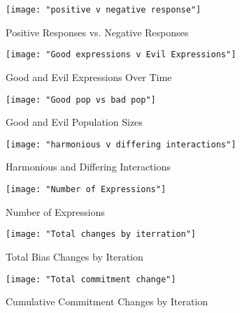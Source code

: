 \documentclass[]{article}
\begin{document}
\begin{figure}
	\centering
	\texttt{[image: "positive v negative response"]}
	\caption{Positive Responses vs. Negative Responses}
	\label{fig:positivevnegativeresponse}
\end{figure}

\begin{figure}
	\centering
	\texttt{[image: "Good expressions v Evil Expressions"]}
	\caption{Good and Evil Expressions Over Time}
	\label{fig:good v evil expressions}
\end{figure}

\begin{figure}
	\centering
	\texttt{[image: "Good pop vs bad pop"]}
	\caption{Good and Evil Population Sizes}
	\label{fig:good v evil pop sizes}
\end{figure}

\begin{figure}
	\centering
	\texttt{[image: "harmonious v differing interactions"]}
	\caption{Harmonious and Differing Interactions}
	\label{fig:harmonious v differing}
\end{figure} 

\begin{figure}
	\centering
	\texttt{[image: "Number of Expressions"]}
	\caption{Number of Expressions}
	\label{fig:expressions}
\end{figure} 

\begin{figure}
	\centering
	\texttt{[image: "Total changes by iterration"]}
	\caption{Total Bias Changes by Iteration}
	\label{fig:changes by iteration}
\end{figure} 

\begin{figure}
	\centering
	\texttt{[image: "Total commitment change"]}
	\caption{Cumulative Commitment Changes by Iteration}
	\label{fig:commitment changes}
\end{figure} 
\end{document}
